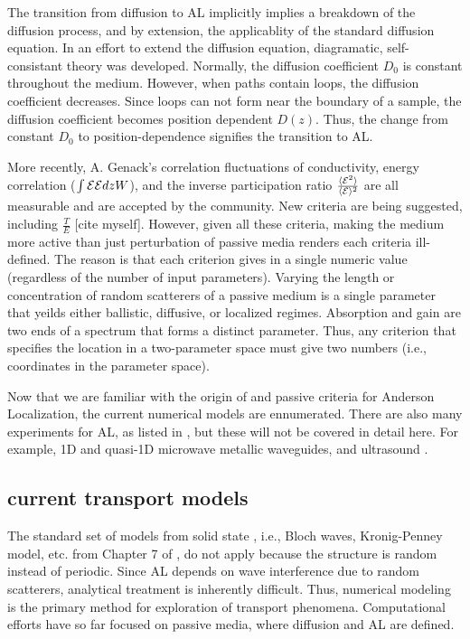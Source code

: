 The transition from diffusion to AL implicitly implies a breakdown of the diffusion process, and by extension, the applicablity of the standard diffusion equation. In an effort to extend the diffusion equation, diagramatic, self-consistant theory \cite{1980_Vollhardt_Wolfle} was developed. Normally, the diffusion coefficient $D_0$ is constant throughout the medium. However, when paths contain loops, the diffusion coefficient decreases. Since loops can not form near the boundary of a sample, the diffusion coefficient becomes position dependent $D(z)$. Thus, the change from constant $D_0$ to position-dependence signifies the transition to AL. 

More recently, A. Genack's \cite{2000_chabanov_nature} correlation fluctuations of conductivity, energy correlation ($\int {\cal E}{\cal E} dz W$), and the inverse participation ratio $\frac{\langle {\cal E}^2 \rangle}{\langle {\cal E} \rangle^2}$ are all measurable and are accepted by the community. New criteria are being suggested, including $\frac{T}{E}$ [cite myself]. However, given all these criteria, making the medium more active than just perturbation of passive media renders each criteria ill-defined. The reason is that each criterion gives in a single numeric value (regardless of the number of input parameters). Varying the length or concentration of random scatterers of a passive medium is a single parameter that yeilds either ballistic, diffusive, or localized regimes. Absorption and gain are two ends of a spectrum that forms a distinct parameter. Thus, any criterion that specifies the location in a two-parameter space must give two numbers (i.e., coordinates in the parameter space). 

Now that we are familiar with the origin of and passive criteria for Anderson Localization, the current numerical models are ennumerated. There are also many experiments for AL, as listed in \cite{2009_Lagendijk_PT}, but these will not be covered in detail here. For example, 1D\cite{2006_Bliokh} and quasi-1D\cite{2008_Genack} microwave metallic waveguides, and ultrasound\cite{2008_van_Tiggelen_Nature}  %
\cite{2008_van_Tiggelen}.

\subsection{current transport models}

The standard set of models from solid state , i.e., Bloch waves, Kronig-Penney model, etc. from Chapter 7 of \cite{2005_Kittel}, do not apply because the structure is random instead of periodic. %
Since AL depends on wave interference due to random scatterers, analytical treatment is inherently difficult. Thus, numerical modeling is the primary method for exploration of transport phenomena. Computational efforts have so far focused on passive media, where diffusion and AL are defined.

